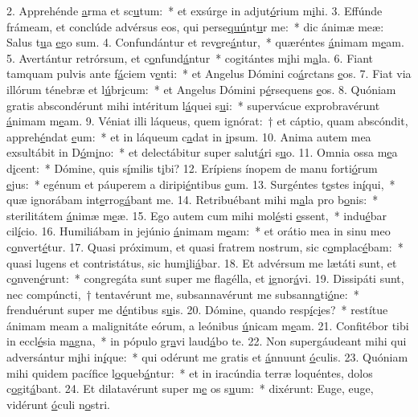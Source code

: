 2. Apprehénde \uline{a}rma et sc\uline{u}tum:~* et exsúrge in adjut\uline{ó}rium m\uline{i}hi.
3. Effúnde frámeam, et conclúde advérsus eos, qui perse\uline{quú}nt\uline{u}r me:~* dic ánimæ meæ: Salus t\uline{u}a \uline{e}go sum.
4. Confundántur et rev\uline{e}re\uline{á}ntur,~* quæréntes \uline{á}nimam m\uline{e}am.
5. Avertántur retrórsum, et c\uline{o}nfund\uline{á}ntur~* cogitántes m\uline{i}hi m\uline{a}la.
6. Fiant tamquam pulvis ante f\uline{á}ciem v\uline{e}nti:~* et Angelus Dómini co\uline{á}rctans \uline{e}os.
7. Fiat via illórum ténebræ et l\uline{ú}br\uline{i}cum:~* et Angelus Dómini p\uline{é}rsequens \uline{e}os.
8. Quóniam gratis abscondérunt mihi intéritum l\uline{á}quei s\uline{u}i:~* supervácue exprobravérunt \uline{á}nimam m\uline{e}am.
9. Véniat illi láqueus, quem ignórat:~† et cáptio, quam abscóndit, appreh\uline{é}ndat \uline{e}um:~* et in láqueum c\uline{a}dat in \uline{i}psum.
10. Anima autem mea exsultábit in D\uline{ó}m\uline{i}no:~* et delectábitur super salut\uline{á}ri s\uline{u}o.
11. Omnia ossa m\uline{e}a d\uline{i}cent:~* Dómine, quis s\uline{í}milis t\uline{i}bi?
12. Erípiens ínopem de manu forti\uline{ó}rum \uline{e}jus:~* egénum et páuperem a diripi\uline{é}ntibus \uline{e}um.
13. Surgéntes t\uline{e}stes in\uline{í}qui,~* quæ ignorábam int\uline{e}rrog\uline{á}bant me.
14. Retribuébant mihi m\uline{a}la pro b\uline{o}nis:~* sterilitátem \uline{á}nimæ m\uline{e}æ.
15. Ego autem cum mihi mol\uline{é}sti \uline{e}ssent,~* indu\uline{é}bar cil\uline{í}cio.
16. Humiliábam in jejúnio \uline{á}nimam m\uline{e}am:~* et orátio mea in sinu meo c\uline{o}nvert\uline{é}tur.
17. Quasi próximum, et quasi fratrem nostrum, sic c\uline{o}mplac\uline{é}bam:~* quasi lugens et contristátus, sic hum\uline{i}li\uline{á}bar.
18. Et advérsum me lætáti sunt, et c\uline{o}nven\uline{é}runt:~* congregáta sunt super me flagélla, et \uline{i}gnor\uline{á}vi.
19. Dissipáti sunt, nec compúncti,~† tentavérunt me, subsannavérunt me subsann\uline{a}ti\uline{ó}ne:~* frenduérunt super me d\uline{é}ntibus s\uline{u}is.
20. Dómine, quando resp\uline{í}c\uline{i}es?~* restítue ánimam meam a malignitáte eórum, a leónibus \uline{ú}nicam m\uline{e}am.
21. Confitébor tibi in eccl\uline{é}sia m\uline{a}gna,~* in pópulo gr\uline{a}vi laud\uline{á}bo te.
22. Non supergáudeant mihi qui adversántur m\uline{i}hi in\uline{í}que:~* qui odérunt me gratis et \uline{á}nnuunt \uline{ó}culis.
23. Quóniam mihi quidem pacífice l\uline{o}queb\uline{á}ntur:~* et in iracúndia terræ loquéntes, dolos c\uline{o}git\uline{á}bant.
24. Et dilatavérunt super m\uline{e} os s\uline{u}um:~* dixérunt: Euge, euge, vidérunt \uline{ó}culi n\uline{o}stri.
